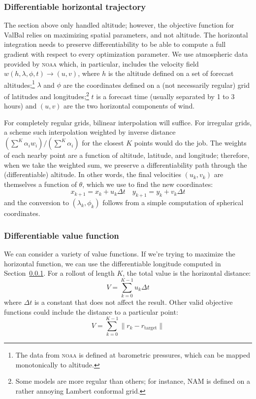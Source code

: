 \documentclass[11pt]{scrartcl} %
\begin{document}
\subsubsection{Differentiable horizontal trajectory} \label{sec:horizontal}
The section above only handled altitude; however, the objective function for ValBal relies on maximizing spatial parameters, and not altitude. The horizontal integration needs to preserve differentiability to be able to compute a full gradient with respect to every optimization parameter. We use atmospheric data provided by \textsc{noaa} which, in particular, includes the velocity field $w(h, \lambda, \phi, t)\to(u, v)$, where $h$ is the altitude defined on a set of forecast altitudes;\footnote{The data from \textsc{noaa} is defined at barometric pressures, which can be mapped monotonically to altitude.} $\lambda$ and $\phi$ are the coordinates defined on a (not necessarily regular) grid of latitudes and longitudes;\footnote{Some models are more regular than others; for instance, NAM is defined on a rather annoying Lambert conformal grid.} $t$ is a forecast time (usually separated by 1 to 3 hours) and $(u, v)$ are the two horizontal components of wind.

For completely regular grids, bilinear interpolation will suffice. For irregular grids, a scheme such interpolation weighted by inverse distance $(\sum^K \alpha_i w_i)/(\sum^K \alpha_i)$ for the closest $K$ points would do the job. The weights of each nearby point are a function of altitude, latitude, and longitude; therefore, when we take the weighted sum, we preserve a differentiability path through the (differentiable) altitude. In other words, the final velocities $(u_k, v_k)$ are themselves a function of $\theta$, which we use to find the new coordinates:
\[x_{k+1} = x_k + u_k\Delta t\quad y_{k+1} = y_k + v_k\Delta t\]
and the conversion to $(\lambda_k, \phi_k)$ follows from a simple computation of spherical coordinates. 

\subsubsection{Differentiable value function}
We can consider a variety of value functions. If we're trying to maximize the horizontal function, we can use the differentiable longitude computed in Section~\ref{sec:horizontal}. For a rollout of length $K$, the total value is the horizontal distance:
\begin{equation}
V = \sum_{k=0}^{K-1} u_k \Delta t\label{eqn:value}
\end{equation}
where $\Delta t$ is a constant that does not affect the result. Other valid objective functions could include the distance to a particular point:
\[V = \sum_{k=0}^{K-1} \lVert r_k - r_\text{target}\rVert\]
\end{document}
